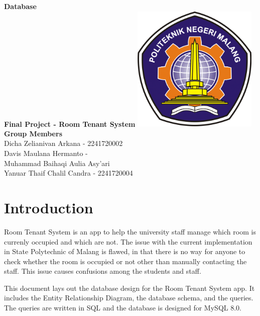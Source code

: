 \documentclass[12pt,titlepage]{article}
\newcommand{\vSubject}{Database}
\newcommand{\vSubtitle}{Final Project - Room Tenant System}
\begin{document}
\begin{titlepage}
    \centering
    \vfill
    {\bfseries\LARGE
        \vSubject\\
        \vskip0.25cm
        \vSubtitle
    }
    \vfill
    \includegraphics[width=6cm]{images/polinema-logo.png}
    \vfill
    {
        \textbf{Group Members}\\
        Dicha Zelianivan Arkana - 2241720002\\
        Davis Maulana Hermanto - \\
        Muhammad Baihaqi Aulia Asy'ari\\
        Yanuar Thaif Chalil Candra - 2241720004\\
    }
\end{titlepage}

\tableofcontents

\pagebreak

\section{Introduction}
Room Tenant System is an app to help the university staff manage which room is currenly occupied and which are not.
The issue with the current implementation in State Polytechnic of Malang is flawed, in that there is no way for anyone
to check whether the room is occupied or not other than manually contacting the staff. This issue causes confusions among
the students and staff.

This document lays out the database design for the Room Tenant System app. It includes the Entity Relationship Diagram, the
database schema, and the queries. The queries are written in SQL and the database is designed for MySQL 8.0.

\pagebreak
\end{document}
